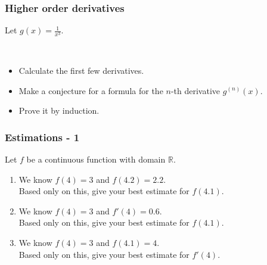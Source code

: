\documentclass[14pt]{beamer}
\newcommand {\DS} [1] {${\displaystyle #1}$}
\newcommand {\R}{\mathbb{R}}
\begin{document}
\begin{frame}[t]
\frametitle{Higher order derivatives}


Let \DS{g(x) = \frac{1}{x^3}}.

\

\begin{itemize}
	\item Calculate the first few derivatives.  
	\item Make a conjecture for a formula for  the $n$-th derivative \DS{g^{(n)}(x)}.
	\item  Prove it by induction.
\end{itemize}

\end{frame}

\begin{frame}
\frametitle{Estimations - 1}

Let $f$ be a continuous function with domain $\R$.

\vfill

\begin{enumerate}
	\item  We know $f(4)=3$ and $f(4.2)=2.2$.  \\
		Based only on this, give your best estimate for $f(4.1)$.
\vfill

	\item  We know $f(4)=3$ and $f'(4)=0.6$. \\
		Based only on this, give your best estimate for $f(4.1)$.
\vfill
		
	\item  We know $f(4)=3$ and $f(4.1) = 4$. \\
		Based only on this, give your best estimate for $f'(4)$.	
\end{enumerate}

\vfill

\end{frame}

\end{document}
